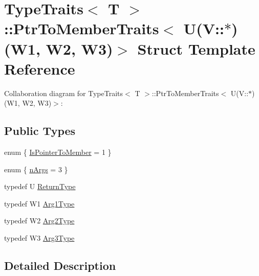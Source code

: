 \hypertarget{structTypeTraits_1_1PtrToMemberTraits_3_01U_07V_1_1_5_08_07W1_00_01W2_00_01W3_08_4}{}\section{Type\+Traits$<$ T $>$\+:\+:Ptr\+To\+Member\+Traits$<$ U(V\+:\+:$\ast$)(W1, W2, W3)$>$ Struct Template Reference}
\label{structTypeTraits_1_1PtrToMemberTraits_3_01U_07V_1_1_5_08_07W1_00_01W2_00_01W3_08_4}


Collaboration diagram for Type\+Traits$<$ T $>$\+:\+:Ptr\+To\+Member\+Traits$<$ U(V\+:\+:$\ast$)(W1, W2, W3)$>$\+:
\subsection*{Public Types}
\begin{DoxyCompactItemize}
\item 
enum \{ \hyperlink{structTypeTraits_1_1PtrToMemberTraits_3_01U_07V_1_1_5_08_07W1_00_01W2_00_01W3_08_4_a1ef93afd4ae33275da3562780f4e4978abaf36810ce3cd999b0774ec6ad9bdb0e}{Is\+Pointer\+To\+Member} = 1
 \}
\item 
enum \{ \hyperlink{structTypeTraits_1_1PtrToMemberTraits_3_01U_07V_1_1_5_08_07W1_00_01W2_00_01W3_08_4_a562b75622d0cb79a614921b280450185a86029240032d4ea1a4e036d833af1db3}{n\+Args} = 3
 \}
\item 
typedef U \hyperlink{structTypeTraits_1_1PtrToMemberTraits_3_01U_07V_1_1_5_08_07W1_00_01W2_00_01W3_08_4_a3e5c48fe741bb789a23c4590c93f6bee}{Return\+Type}
\item 
typedef W1 \hyperlink{structTypeTraits_1_1PtrToMemberTraits_3_01U_07V_1_1_5_08_07W1_00_01W2_00_01W3_08_4_af59af076ef690d78f4668b97b899f142}{Arg1\+Type}
\item 
typedef W2 \hyperlink{structTypeTraits_1_1PtrToMemberTraits_3_01U_07V_1_1_5_08_07W1_00_01W2_00_01W3_08_4_a93e0a6c1de9ef92609d82976fef7b973}{Arg2\+Type}
\item 
typedef W3 \hyperlink{structTypeTraits_1_1PtrToMemberTraits_3_01U_07V_1_1_5_08_07W1_00_01W2_00_01W3_08_4_aec061b39fafbc200c8375f931391ef70}{Arg3\+Type}
\end{DoxyCompactItemize}


\subsection{Detailed Description}
